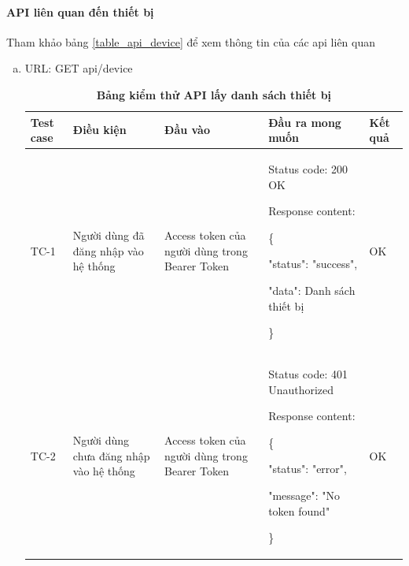 \paragraph{API liên quan đến thiết bị}
\mbox{}

Tham khảo bảng \ref{table_api_device} để xem thông tin của các api liên quan

\begin{enumerate}[a)]
  \item URL: GET api/device
    
    \begin{xltabular}{\textwidth}{
      | >{\raggedright\arraybackslash}p{1cm}
      | >{\raggedright\arraybackslash}p{2.5cm}
      | >{\raggedright\arraybackslash}p{2.5cm}
      | >{\raggedright\arraybackslash}X
      | >{\raggedright\arraybackslash}p{1cm}|
      }
      \caption{\bfseries \fontsize{12pt}{0pt}\selectfont Bảng kiểm thử API lấy danh sách thiết bị}
      \\
      \hline
      \bfseries Test case    &\bfseries Điều kiện   &\bfseries Đầu vào 
      &\bfseries Đầu ra mong muốn &\bfseries Kết quả\\ \hline
    
    
      TC-1
      & Người dùng đã đăng nhập vào hệ thống
      & Access token của người dùng trong Bearer Token
    
      & 
    
      Status code: 200 OK
    
        Response content:
    
        \{
    
      "status": "success",
    
      "data": Danh sách thiết bị
    
      \}
      & OK
    
      \\ \hline
    
      TC-2
      & Người dùng chưa đăng nhập vào hệ thống
      & Access token của người dùng trong Bearer Token
    
      & 
    
      Status code: 401 Unauthorized
    
        Response content:
    
        \{
    
      "status": "error",
    
      "message": "No token found"
    
      \}
      & OK
      \\ \hline


\end{xltabular}
\end{enumerate}

